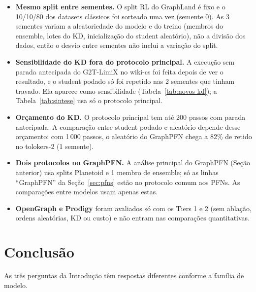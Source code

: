 \documentclass[12pt,a4paper]{article}
\begin{document}
\begin{itemize}
  \item \textbf{Mesmo split entre sementes.} O split RL do GraphLand é fixo e o 10/10/80 dos datasets clássicos foi sorteado uma vez (semente 0). As 3 sementes variam a aleatoriedade do modelo e do treino (membros do ensemble, lotes do KD, inicialização do student aleatório), não a divisão dos dados, então o desvio entre sementes não inclui a variação do split.
  \item \textbf{Sensibilidade do KD fora do protocolo principal.} A execução sem parada antecipada do G2T-LimiX no wiki-cs foi feita depois de ver o resultado, e o student podado só foi repetido nas 2 sementes que tinham travado. Ela aparece como sensibilidade (Tabela~\ref{tab:novos-kd}); a Tabela~\ref{tab:sintese} usa só o protocolo principal.
  \item \textbf{Orçamento do KD.} O protocolo principal tem até 200 passos com parada antecipada. A comparação entre student podado e aleatório depende desse orçamento: com 1\,000 passos, o aleatório do GraphPFN chega a 82\% de retido no tolokers-2 (1 semente).
  \item \textbf{Dois protocolos no GraphPFN.} A análise principal do GraphPFN (Seção anterior) usa splits Planetoid e 1 membro de ensemble; só as linhas ``GraphPFN'' da Seção~\ref{sec:pfns} estão no protocolo comum aos PFNs. As comparações entre modelos usam apenas estas.
  \item \textbf{OpenGraph e Prodigy} foram avaliados só com os Tiers 1 e 2 (sem ablação, ordens aleatórias, KD ou custo) e não entram nas comparações quantitativas.
\end{itemize}

\section{Conclusão}

As três perguntas da Introdução têm respostas diferentes conforme a família de modelo.
\end{document}
